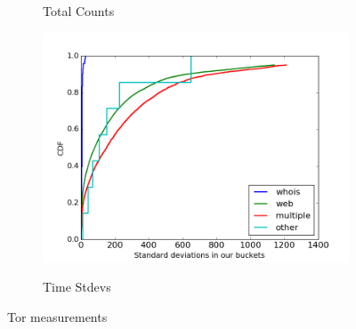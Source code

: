 \begin{figure}
\begin{subfigure}[t]{0.32\textwidth}
		\label{fig:stats_b}
		\caption{Total Counts}
	\end{subfigure}
	\begin{subfigure}[t]{0.32\textwidth}
		\centering
		\includegraphics[scale=0.3]{images/stddevs.png}
		\label{fig:stats_c}
		\caption{Time Stdevs}
	\end{subfigure}
	\label{fig:measurements}
	\caption{Tor measurements}
\end{figure}
